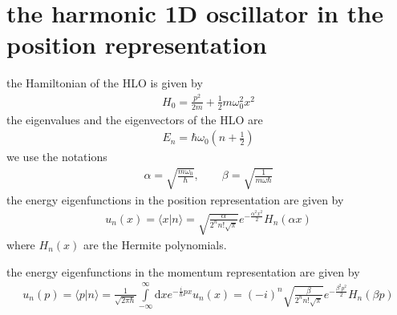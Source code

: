 \section{the harmonic 1D oscillator in the position representation}

the Hamiltonian of the HLO is given by
\begin{align}
  H_0 = \frac{p^2}{2m} + \frac{1}{2}m\omega_0^2x^2
\end{align}
the eigenvalues and the eigenvectors of the HLO are
\begin{align}
  E_n = \hbar\omega_0\left(n+\frac{1}{2}\right)
\end{align}
we use the notations
\begin{align}
  \alpha = \sqrt{\frac{m\omega_0}{\hbar}},\qquad \beta = \sqrt{\frac{1}{m\omega\hbar}}
\end{align}
the energy eigenfunctions in the position representation are given by
\begin{align}
  u_n(x) = \langle x|n\rangle = \sqrt{\frac{\alpha}{2^n n!\sqrt{\pi}}}e^{-\frac{\alpha^2x^2}{2}}H_n(\alpha x)
\end{align}
where $H_n(x)$ are the Hermite polynomials.

the energy eigenfunctions in the momentum representation are given by
\begin{align}
  u_n(p) = \langle p|n\rangle = \frac{1}{\sqrt{2\pi\hbar}}\int\limits_{-\infty}^{\infty}\mathrm{d}x e^{-\frac{i}{\hbar}px}u_n(x) = (-i)^n\sqrt{\frac{\beta}{2^n n!\sqrt{\pi}}}e^{-\frac{\beta^2p^2}{2}}H_n(\beta p)
\end{align}
